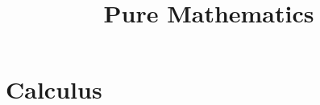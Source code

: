 \documentclass[MathsNotesBase.tex]{subfiles}
\title{Pure Mathematics}
\date{\vspace{-6ex}}
\begin{document}
	\sloppy
	\maketitle
	
	
	\newpage
	
	
	\newpage
	
	
	\pagebreak
	
	\newpage
	
	
	\newpage
	
	
	
	
	
	\newpage
	\chapter{Calculus}\bigskip\bigskip
	
	\newpage
	
	\newpage
	
\end{document}
